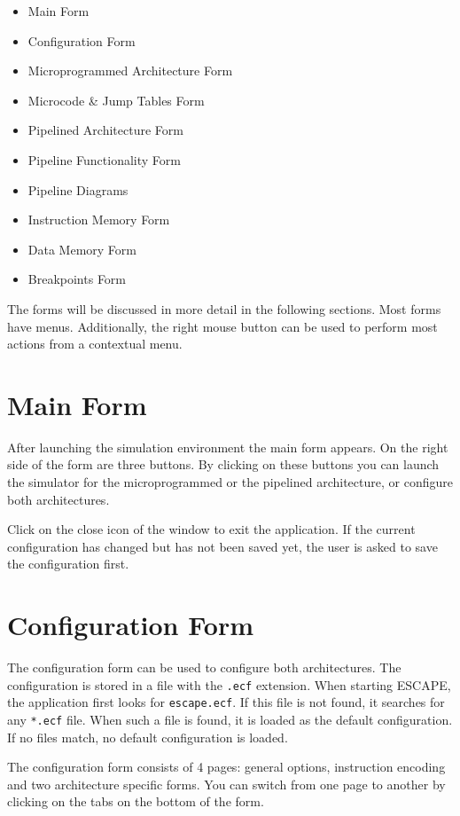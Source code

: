 \documentclass{article}
\begin{document}
\begin{itemize}
\item Main Form
\item Configuration Form
\item Microprogrammed Architecture Form
\item Microcode \& Jump Tables Form
\item Pipelined Architecture Form
\item Pipeline Functionality Form
\item Pipeline Diagrams
\item Instruction Memory Form
\item Data Memory Form
\item Breakpoints Form
\end{itemize}

The forms will be discussed in more detail in the following sections. Most forms have menus.  Additionally, the right mouse
button can be used to perform most actions from a contextual menu.

\section{Main Form}
After launching the simulation environment the main form appears. On the right side of the form are three buttons. By
clicking on these buttons you can launch the simulator for the microprogrammed or the pipelined architecture, or
configure both architectures.

Click on the close icon of the window to exit the application. If the
 current configuration has changed but has not been saved yet, the user 
is asked to save the configuration first.

\section{Configuration Form}
The configuration form can be used to configure both architectures. The configuration is stored in a file with the \texttt{.ecf} extension.
When starting ESCAPE, the application first looks for \texttt{escape.ecf}. If this file is not found, it searches for any \texttt{*.ecf}
 file. When such a file is found, it is loaded as the default 
configuration. If no files match, no default configuration is loaded.

The configuration form consists of 4 pages: general options, instruction encoding and two architecture specific
forms. You can switch from one page to another by clicking on the tabs on the bottom of the form.
\end{document}
